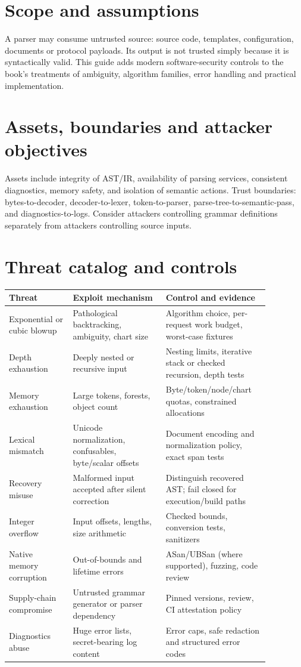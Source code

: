 \documentclass[11pt,letterpaper]{article}
\begin{document}
\makedoctitle\makedocsummary
\tableofcontents\clearpage
\section{Scope and assumptions}
A parser may consume untrusted source: source code, templates, configuration, documents or protocol payloads. Its output is not trusted simply because it is syntactically valid. This guide adds modern software-security controls to the book's treatments of ambiguity, algorithm families, error handling and practical implementation.
\section{Assets, boundaries and attacker objectives}
Assets include integrity of AST/IR, availability of parsing services, consistent diagnostics, memory safety, and isolation of semantic actions. Trust boundaries: bytes-to-decoder, decoder-to-lexer, token-to-parser, parse-tree-to-semantic-pass, and diagnostics-to-logs. Consider attackers controlling grammar definitions separately from attackers controlling source inputs.
\section{Threat catalog and controls}
\small\begin{longtable}{p{0.22\linewidth}p{0.32\linewidth}p{0.33\linewidth}}\toprule Threat & Exploit mechanism & Control and evidence\\\midrule\endhead
Exponential or cubic blowup & Pathological backtracking, ambiguity, chart size & Algorithm choice, per-request work budget, worst-case fixtures\\
Depth exhaustion & Deeply nested or recursive input & Nesting limits, iterative stack or checked recursion, depth tests\\
Memory exhaustion & Large tokens, forests, object count & Byte/token/node/chart quotas, constrained allocations\\
Lexical mismatch & Unicode normalization, confusables, byte/scalar offsets & Document encoding and normalization policy, exact span tests\\
Recovery misuse & Malformed input accepted after silent correction & Distinguish recovered AST; fail closed for execution/build paths\\
Integer overflow & Input offsets, lengths, size arithmetic & Checked bounds, conversion tests, sanitizers\\
Native memory corruption & Out-of-bounds and lifetime errors & ASan/UBSan (where supported), fuzzing, code review\\
Supply-chain compromise & Untrusted grammar generator or parser dependency & Pinned versions, review, CI attestation policy\\
Diagnostics abuse & Huge error lists, secret-bearing log content & Error caps, safe redaction and structured error codes\\
\bottomrule\end{longtable}\normalsize
\end{document}

